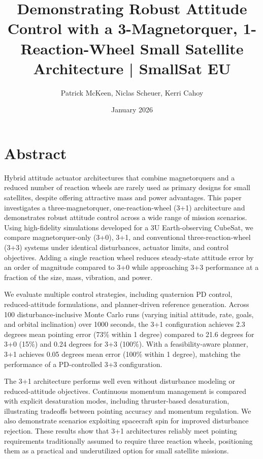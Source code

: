 \documentclass[9pt]{extarticle}
\title{Demonstrating Robust Attitude Control with a 3-Magnetorquer, 1-Reaction-Wheel Small Satellite Architecture | SmallSat EU}
\author{Patrick McKeen, Niclas Scheuer, Kerri Cahoy}
\date{January 2026}
\begin{document}
\maketitle

\section{Abstract}
Hybrid attitude actuator architectures that combine magnetorquers and a reduced number of reaction wheels are rarely used as primary designs for small satellites, despite offering attractive mass and power advantages. This paper investigates a three-magnetorquer, one-reaction-wheel (3+1) architecture and demonstrates robust attitude control across a wide range of mission scenarios. Using high-fidelity simulations developed for a 3U Earth-observing CubeSat, we compare magnetorquer-only (3+0), 3+1, and conventional three-reaction-wheel (3+3) systems under identical disturbances, actuator limits, and control objectives. Adding a single reaction wheel reduces steady-state attitude error by an order of magnitude compared to 3+0 while approaching 3+3 performance at a fraction of the size, mass, vibration, and power.

We evaluate multiple control strategies, including quaternion PD control, reduced-attitude formulations, and planner-driven reference generation. Across 100 disturbance-inclusive Monte Carlo runs (varying initial attitude, rate, goals, and orbital inclination) over 1000 seconds, the 3+1 configuration achieves 2.3 degrees mean pointing error (73\% within 1 degree) compared to 21.6 degrees for 3+0 (15\%) and 0.24 degrees for 3+3 (100\%). With a feasibility-aware planner, 3+1 achieves 0.05 degrees mean error (100\% within 1 degree), matching the performance of a PD-controlled 3+3 configuration.

The 3+1 architecture performs well even without disturbance modeling or reduced-attitude objectives. Continuous momentum management is compared with explicit desaturation modes, including thruster-based desaturation, illustrating tradeoffs between pointing accuracy and momentum regulation. We also demonstrate scenarios exploiting spacecraft spin for improved disturbance rejection. These results show that 3+1 architectures reliably meet pointing requirements traditionally assumed to require three reaction wheels, positioning them as a practical and underutilized option for small satellite missions.
\end{document}
